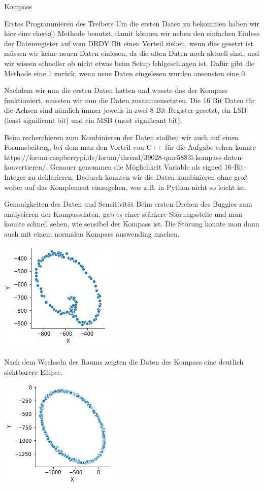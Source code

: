 \documentclass[12pt]{report}
\begin{document}
\begin{section}{Kompass}
\begin{subsection}{Erstes Programmieren des Treibers}
  Um die ersten Daten zu bekommen haben wir hier eine check() Methode benutzt, damit können wir neben den 
  einfachen Einlese der Datenregister auf vom DRDY Bit einen Vorteil ziehen, wenn dies gesetzt ist müssen wir 
  keine neuen Daten einlesen, da die alten Daten noch aktuell sind, und wir wissen schneller ob nicht etwas beim 
  Setup fehlgeschlagen ist. Dafür gibt die Methode eine 1 zurück, wenn neue Daten eingelesen wurden ansonsten eine 
  0.
  
  Nachdem wir nun die ersten Daten hatten und wusste das der Kompass funktioniert, mussten wir nun die Daten 
  zusammensetzten. Die 16 Bit Daten für die Achsen sind nämlich immer jeweils in zwei 8 Bit Register gesetzt, ein 
  LSB (least significant bit) und ein MSB (most significant bit).
  
  Beim recherchieren zum Kombinieren der Daten stoßten wir auch auf einen Forumsbeitrag, bei dem man den Vorteil 
  von C++ für die Aufgabe sehen konnte 
  https://forum-raspberrypi.de/forum/thread/39028-qmc5883l-kompass-daten-konvertieren/. Genauer genommen die 
  Möglichkeit Variable als signed 16-Bit-Integer zu deklarieren. Dadurch konnten wir die Daten kombinieren ohne 
  groß weiter auf das Komplement einzugehen, was z.B. in Python nicht so leicht ist.
  \end{subsection}
  \begin{subsection}{Genauigkeiten der Daten und Sensitivität}
  Beim ersten Drehen des Buggies zum analysieren der Kompassdaten, gab es einer stärkere Störungsstelle und man 
  konnte schnell sehen, wie sensibel der Kompass ist. Die Störung konnte man dann auch mit einem normalen Kompass 
  auswending machen.
  
  \includegraphics[scale=1]{lernportfolio_assets/MagnetDatenStorung}
  
  Nach dem Wechseln des Raums zeigten die Daten des Kompass eine deutlich sichtbarere Ellipse.
  
  \includegraphics[scale=1]{lernportfolio_assets/MagnetDaten}
  

\end{subsection}
\end{section}
\end{document}
